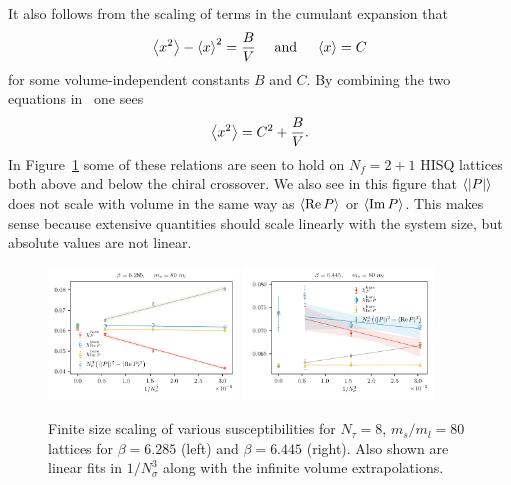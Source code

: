 It also follows from the scaling of terms in the cumulant expansion that
\begin{equation}\label{eq:fssre}
  \ev{x^2}-\ev{x}^2=\frac{B}{V}~~~~\text{and}~~~~\ev{x}=C
\end{equation}
for some volume-independent constants $B$ and $C$. By combining the two
equations in~ one sees
\begin{equation}
  \ev{x^2}=C^2+\frac{B}{V}.
\end{equation}
In Figure~\ref{fig:FSSScalingOfSuscs} some of these relations are seen
to hold on $N_f=2+1$ HISQ lattices both above and below the chiral crossover.
We also see in this figure that $\ev{|P|}$ does not scale with volume 
in the same way as $\ev{\Re P}$ or $\ev{\Im P}$. This makes sense because
extensive quantities should scale linearly with the system size, but
absolute values are not linear. 

\begin{figure}
  \centering
  \includegraphics[width=0.45\textwidth]{figs/allSuscs_b6285.pdf}
  \includegraphics[width=0.45\textwidth]{figs/allSuscs_b6445.pdf}
  \caption{Finite size scaling of various susceptibilities
           for $N_\tau=8$, $m_s/m_l=80$ lattices for
           $\beta=6.285$ (left) and $\beta=6.445$ (right). Also shown are
           linear fits in $1/N_\sigma^3$ along with the
           infinite volume extrapolations.}
  \label{fig:FSSScalingOfSuscs}
\end{figure}


